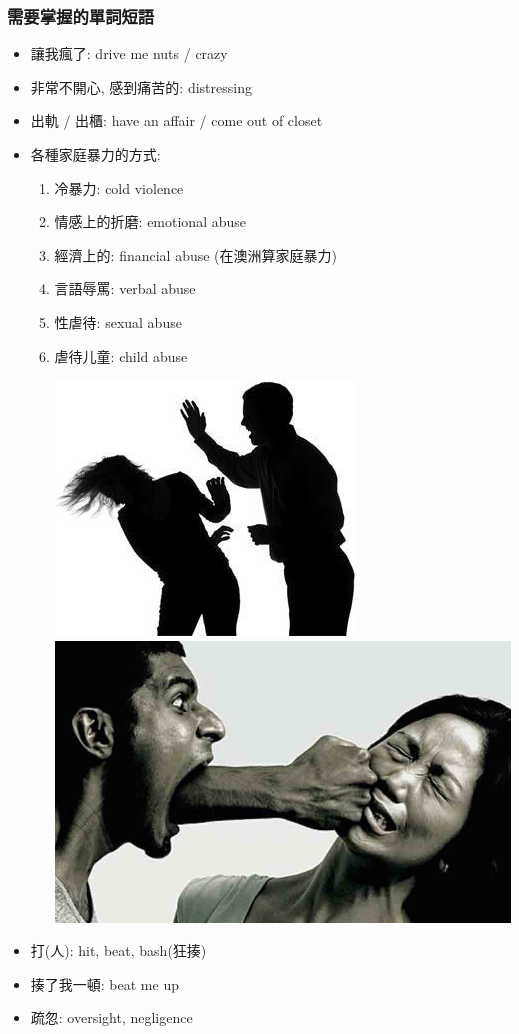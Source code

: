 \subsubsection*{需要掌握的單詞短語}
\begin{itemize}
  \itemsep0em
  \item 讓我瘋了: drive me nuts / crazy
  \item 非常不開心, 感到痛苦的: distressing
  \item 出軌 / 出櫃: have an affair / come out of closet
  \item 各種家庭暴力的方式:
  \begin{enumerate}
    \itemsep0em
    \item 冷暴力: cold violence
    \item 情感上的折磨: emotional abuse
    \item 經濟上的: financial abuse (在澳洲算家庭暴力)
    \item 言語辱罵: verbal abuse
    \item 性虐待: sexual abuse
    \item 虐待儿童: child abuse
    \begin{center}
      \includegraphics[scale=.5]{pics/abuse}
      \includegraphics[scale=.3]{pics/verbal-abuse}
    \end{center}
  \end{enumerate}
  \item 打(人): hit, beat, bash(狂揍)
  \item 揍了我一頓: beat me up
  \item 疏忽: oversight, negligence
\end{itemize}

